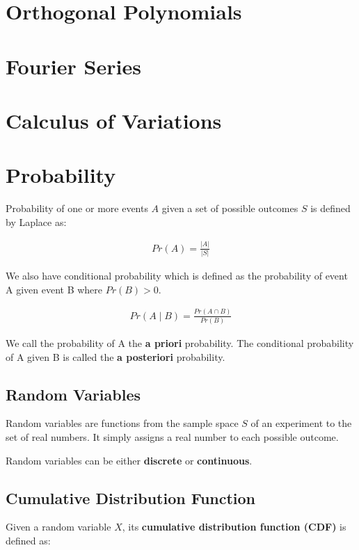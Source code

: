 \documentclass[11pt]{article}
\begin{document}
\section{Orthogonal Polynomials}
\label{sec:org2f0e1e1}
\section{Fourier Series}
\label{sec:org204beb1}
\section{Calculus of Variations}
\label{sec:orge965076}
\section{Probability}
\label{sec:org6414b8f}
Probability of one or more events \(A\) given a set of possible outcomes \(S\) is defined by Laplace as:

\begin{align*}
    Pr\left(A\right) = \frac{\vert A \vert}{\vert S \vert}
\end{align*}

We also have conditional probability which is defined as the probability of event A given event B where \(Pr\left(B\right) > 0\).

\begin{align*}
     Pr\left(A \mid B\right) = \frac{Pr\left(A \cap B\right)}{Pr\left(B\right)}
\end{align*}

We call the probability of A the \textbf{a priori} probability. The conditional probability of A given B is called the \textbf{a posteriori} probability.

\subsection{Random Variables}
\label{sec:org10c15ef}
Random variables are functions from the sample space \(S\) of an experiment to the set of real numbers. It simply assigns a real number to each possible outcome.

Random variables can be either \textbf{discrete} or \textbf{continuous}.

\subsection{Cumulative Distribution Function}
\label{sec:org60b2661}
Given a random variable \(X\), its \textbf{cumulative distribution function (CDF)} is defined as:
\end{document}
